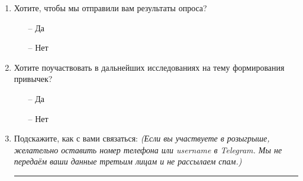\documentclass[pdflatex,sn-mathphys-num]{sn-jnl}%
\theoremstyle{thmstyleone}%
\theoremstyle{thmstyletwo}%
\theoremstyle{thmstylethree}%
\begin{document}
\begin{appendices}
\begin{enumerate}
  \item Хотите, чтобы мы отправили вам результаты опроса?
  \begin{itemize}
    \item[–] Да
    \item[–] Нет
  \end{itemize}

  \item Хотите поучаствовать в дальнейших исследованиях на тему формирования привычек?
  \begin{itemize}
    \item[–] Да
    \item[–] Нет
  \end{itemize}

  \item Подскажите, как с вами связаться:  
  \textit{(Если вы участвуете в розыгрыше, желательно оставить номер телефона или username в Telegram. Мы не передаём ваши данные третьим лицам и не рассылаем спам.)}

  \rule{\linewidth}{0.4pt}

\end{enumerate}

\end{appendices}


\end{document}
